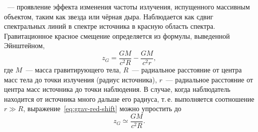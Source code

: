 ~--- проявление эффекта изменения частоты излучения, испущенного массивным объектом, таким как звезда или чёрная дыра. Наблюдается как сдвиг спектральных линий в спектре источника в красную область спектра. Гравитационное красное смещение определяется из формулы, выведенной Эйнштейном,
\begin{equation}
z_G=\dfrac{GM}{c^2 R}-\dfrac{GM}{c^2 r},
\label{eq:grav-red-shift}
\end{equation}
где $M$~--- масса гравитирующего тела, $R$~--- радиальное расстояние от центра масс тела до точки излучения (радиус источника), $r$~---  радиальное расстояние от центра масс источника до точки наблюдения. В случае, когда наблюдатель находится от источника много дальше его радиуса, т.\,е. выполняется соотношение $r \gg R$, выражение~\eqref{eq:grav-red-shift} можно упростить до
\begin{equation}
z_G \simeq \dfrac{GM}{c^2 R}.
\end{equation}
